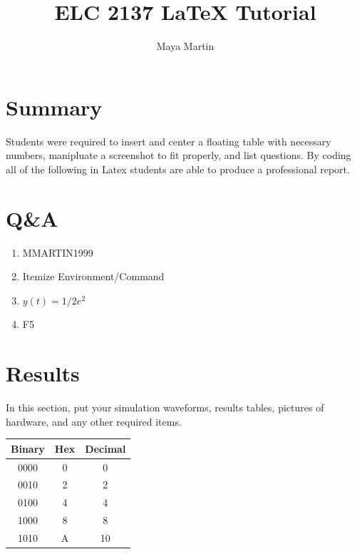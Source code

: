 \documentclass[11pt]{article}
\begin{document}
\title{ELC 2137 LaTeX Tutorial }
\author{Maya Martin}
\maketitle

\section*{Summary}

Students were required to insert and center a floating table with necessary numbers, manipluate a screenshot to fit properly, and list questions. By coding all of the following in Latex students are able to produce a professional report.


\section*{Q\&A}
\begin{enumerate}
	\item MMARTIN1999
	\item Itemize Environment/Command 
	\item $y(t) = 1/2e^2$
	\item F5
  \end{enumerate}
  
  

  
  
\section*{Results}
In this section, put your simulation waveforms, results tables, pictures of hardware, and any other required items.
\begin{center}
	\begin{tabular}{cc|c}
		\toprule
		Binary & Hex & Decimal \\
		\midrule
		0000 & 0 & 0 \\
		0010 & 2 & 2 \\
		0100 & 4 & 4 \\
		1000 & 8 & 8 \\
		1010 & A & 10 \\
		\bottomrule
	\end{tabular} 
\end{center}
\end{document}
